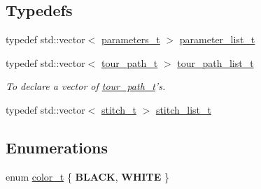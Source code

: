 \subsection*{\-Typedefs}
\begin{DoxyCompactItemize}
\item 
typedef std\-::vector$<$ \hyperlink{structknight__path__t_1_1parameters__t}{parameters\-\_\-t} $>$ \hyperlink{namespaceknight__path__t_a50060ec18677595e6da97bc413ddc016}{parameter\-\_\-list\-\_\-t}
\item 
\hypertarget{namespaceknight__path__t_a9e0a15a5d1f3d40a7ad5fe101905764a}{typedef std\-::vector$<$ \hyperlink{structknight__path__t_1_1tour__path__t}{tour\-\_\-path\-\_\-t} $>$ \hyperlink{namespaceknight__path__t_a9e0a15a5d1f3d40a7ad5fe101905764a}{tour\-\_\-path\-\_\-list\-\_\-t}}\label{namespaceknight__path__t_a9e0a15a5d1f3d40a7ad5fe101905764a}

\begin{DoxyCompactList}\small\item\em \-To declare a vector of \hyperlink{structknight__path__t_1_1tour__path__t}{tour\-\_\-path\-\_\-t}'s. \end{DoxyCompactList}\item 
typedef std\-::vector$<$ \hyperlink{structknight__path__t_1_1stitch__t}{stitch\-\_\-t} $>$ \hyperlink{namespaceknight__path__t_ab13938a6b52c0039f4123b0fe02e6ef4}{stitch\-\_\-list\-\_\-t}
\end{DoxyCompactItemize}
\subsection*{\-Enumerations}
\begin{DoxyCompactItemize}
\item 
enum \hyperlink{namespaceknight__path__t_a0a9ffd13fa55164ea2147a92e4cf1d9d}{color\-\_\-t} \{ {\bfseries \-B\-L\-A\-C\-K}, 
{\bfseries \-W\-H\-I\-T\-E}
 \}
\end{DoxyCompactItemize}
